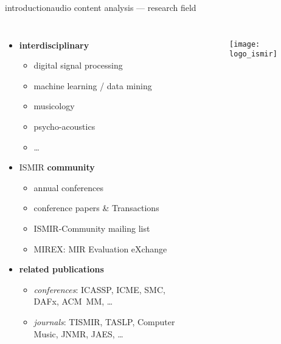         \begin{frame}{introduction}{audio content analysis --- research field}
            \vspace{-7mm}
            \begin{columns}
            \begin{itemize}
                \item<1->   \textbf{interdisciplinary}
                    \begin{itemize}
                        \item   digital signal processing
                        \item   machine learning / data mining
                        \item   musicology
                        \item   psycho-acoustics
                        \item   \ldots
                    \end{itemize}
                \smallskip
                \item<2->   ISMIR \textbf{community}
                            \begin{itemize}
                                \item   annual conferences
                                \item   conference papers \& Transactions
                                \item   ISMIR-Community mailing list
                                \item   MIREX: MIR Evaluation eXchange
                            \end{itemize}
                \smallskip
                \item<3->   \textbf{related publications} 
                    \begin{itemize}
                        \item   \textit{conferences}: ICASSP, ICME, SMC, DAFx, ACM~MM, \ldots
                        \item   \textit{journals}: TISMIR, TASLP, Computer Music, JNMR, JAES, \ldots
                    \end{itemize}
            \end{itemize}
                \vspace{25mm}
                \begin{figure}
                    \texttt{[image: logo\_ismir]}
                \end{figure}
            \end{columns}
        \end{frame}
